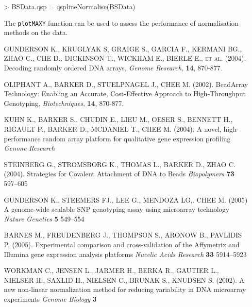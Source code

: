 \documentclass[a4paper]{article}
\newcommand{\Rfunction}[1]{{\texttt{#1}}}
\begin{document}
\begin{Schunk}
\begin{Sinput}
> BSData.qsp = qsplineNormalise(BSData)
\end{Sinput}
\end{Schunk}

The \Rfunction{plotMAXY} function can be used to assess the
performance of normalisation methods on the data.



\begin{thebibliography}{77}

\textsc{GUNDERSON K., KRUGLYAK S, GRAIGE S., GARCIA F., KERMANI BG., ZHAO C., CHE D., DICKINSON T., WICKHAM E., BIERLE E., et al.}
 (2004).
 Decoding randomly ordered DNA arrays,
\textit{Genome Research},
\textbf{14},
 870-877.
 
\textsc{OLIPHANT A., BARKER D., STUELPNAGEL J., CHEE M.}
 (2002).
 BeadArray Technology: Enabling an Accurate, Cost-Effective Approach to High-Throughput Genotyping,
\textit{Biotechniques},
\textbf{14},
 870-877.

\textsc{KUHN K., BARKER S., CHUDIN E., LIEU M., OESER S., BENNETT H., RIGAULT P., BARKER D., MCDANIEL T., CHEE M.} 
(2004).
A novel, high-performance random array platform for qualitative gene expression profiling
\textit{Genone Research}

\textsc{STEINBERG G., STROMSBORG K., THOMAS L., BARKER D., ZHAO C. }
(2004).
Strategies for Covalent Attachment of DNA to Beads
\textit{Biopolymers}
\textbf{73}
597--605

\textsc{GUNDERSON K., STEEMERS FJ., LEE G., MENDOZA LG,. CHEE M.}
(2005)
A genome-wide scalable SNP genotyping assay using microarray technology
\textit{Nature Genetics}
\textbf{5}
549--554

\textsc{BARNES M., FREUDENBERG J., THOMPSON S., ARONOW B., PAVLIDIS P.}
(2005).
Experimental comparison and cross-validation of the Affymetrix and Illumina gene expression analysis platforms
\textit{Nucelic Acids Research}
\textbf{33}
5914--5923

\textsc{WORKMAN C., JENSEN L., JARMER H., BERKA R., GAUTIER L., NIELSER H., SAXLID H., NIELSEN C., BRUNAK S., KNUDSEN S.}
(2002).
A new non-linear normalization method for reducing variability in DNA microarray experiments
\textit{Genome Biology}
\textbf{3}

\end{thebibliography}
\end{document}

